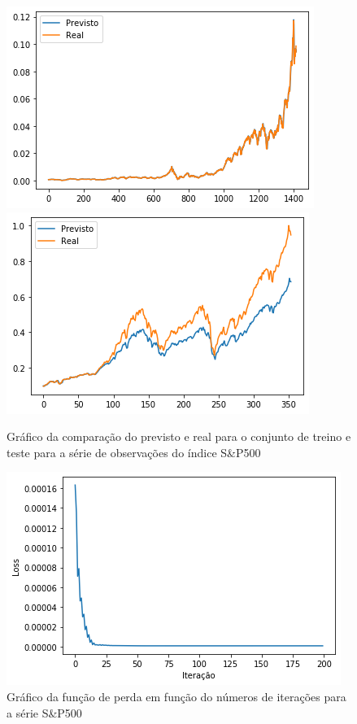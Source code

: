 \documentclass[
    12pt,
    oneside,
    a4paper,
    english,
    brazil
]{abntex2}
\begin{document}
\begin{figure}[ht]
    \centering
    \caption{Gráfico  da  comparação  do  previsto   e  real  para  o  conjunto
    de   treino   e   teste   para   a   série   de   observações   do   índice
    S\&P500}\label{fig:sp500_overfit}
        \includegraphics[width=\linewidth]{images/sp500_overfit_train.png}
    \endminipage\hfill
        \includegraphics[width=\linewidth]{images/sp500_overfit_test.png}
    \endminipage\hfill
\end{figure}

\begin{figure}[ht]
    \centering
    \caption{Gráfico da função de perda em  função do números de iterações para
    a série S\&P500}\label{fig:iter_sp500_overfit}
    \includegraphics[width=.5\linewidth]{images/sp500_overfit_iter.png}
\end{figure}
\end{document}
